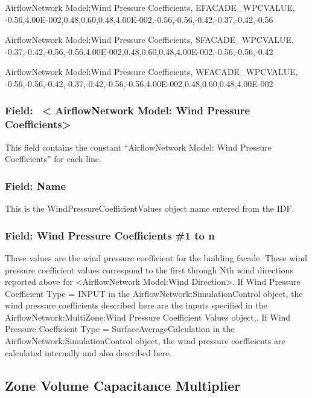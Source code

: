 AirflowNetwork Model:Wind Pressure Coefficients, EFACADE\_WPCVALUE, -0.56,4.00E-002,0.48,0.60,0.48,4.00E-002,-0.56,-0.56,-0.42,-0.37,-0.42,-0.56

AirflowNetwork Model:Wind Pressure Coefficients, SFACADE\_WPCVALUE, -0.37,-0.42,-0.56,-0.56,4.00E-002,0.48,0.60,0.48,4.00E-002,-0.56,-0.56,-0.42

AirflowNetwork Model:Wind Pressure Coefficients, WFACADE\_WPCVALUE, -0.56,-0.56,-0.42,-0.37,-0.42,-0.56,-0.56,4.00E-002,0.48,0.60,0.48,4.00E-002

\subsubsection{Field:~ \textless{} AirflowNetwork Model: Wind Pressure Coefficients\textgreater{}}\label{field-airflownetwork-model-wind-pressure-coefficients}

This field contains the constant ``AirflowNetwork Model: Wind Pressure Coefficients'' for each line.

\subsubsection{Field: Name}\label{field-name}

This is the WindPressureCoefficientValues object name entered from the IDF.

\subsubsection{Field: Wind Pressure Coefficients \#1 to n}\label{field-wind-pressure-coefficients-1-to-n}

These values are the wind pressure coefficient for the building facade. These wind pressure coefficient values correspond to the first through Nth wind directions reported above for \textless{}AirflowNetwork Model:Wind Direction\textgreater{}. If Wind Pressure Coefficient Type = INPUT in the AirflowNetwork:SimulationControl object, the wind pressure coefficients described here are the inputs specified in the AirflowNetwork:MultiZone:Wind Pressure Coefficient Values object,. If Wind Pressure Coefficient Type = SurfaceAverageCalculation in the AirflowNetwork:SimulationControl object, the wind pressure coefficients are calculated internally and also described here.

\subsection{Zone Volume Capacitance Multiplier}\label{zone-volume-capacitance-multiplier}


